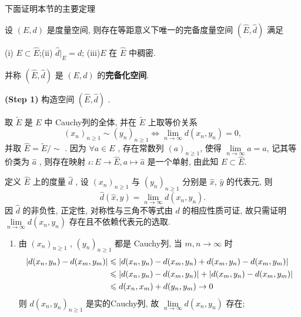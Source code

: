      下面证明本节的主要定理

     \begin{Theorem}[度量空间的完备化]
           设 $ (E, d) $ 是度量空间, 则存在等距意义下唯一的完备度量空间 $ (\widehat{E}, \hat{d}) $ 满足
           
           (i) $ E\subset \widehat{E} $;\hspace{6em}(ii) $ \hat{d}|_{E}=d $;\hspace{6em}  (iii)$ E $ 在 $ \widehat{E} $ 中稠密. 

           \noindent 并称 $ (\widehat{E}, \hat{d}) $ 是 $ (E, d) $ 的\textbf{完备化空间}.
     \end{Theorem}
     \begin{Proof}

          \textbf{(Step 1)} 构造空间 $ (\widehat{E}, \hat{d}) $ .

          取 $ \widetilde{E} $ 是 $ E $ 中 Cauchy列的全体, 并在 $ \widetilde{E} $ 上取等价关系
          \[
               (x_{n})_{n\geqslant1}\sim (y_{n})_{n\geqslant1}\Longleftrightarrow \lim_{n\to\infty}d(x_{n},y_{n})=0,
          \]
          并取 $ \widehat{E}=\widetilde{E}/\sim $ . 因为 $ \forall a\in E $ , 存在常数列  $ (a)_{n\geqslant1} $, 使得 $ \lim\limits_{n\to\infty}a=a $, 记其等价类为 $ \hat{a} $ , 则存在映射 $ \iota :E\to\widehat{E}, a\mapsto \hat{a} $ 是一个单射, 由此知 $ E\subset\widehat{E} $. 

          定义 $ \widehat{E} $ 上的度量 $ \hat{d} $ , 设 $ (x_{n})_{n\geqslant1} $ 与 $ (y_{n})_{n\geqslant1} $ 分别是 $ \hat{x} $, $ \hat{y} $ 的代表元, 则
          \[
               \hat{d}(\hat{x}, \hat{y})=\lim_{n\to\infty}d(x_{n},y_{n}).
          \]
          因 $ \hat{d} $ 的非负性, 正定性, 对称性与三角不等式由 $ d $ 的相应性质可证, 故只需证明 $ \lim\limits_{n\to\infty}d(x_{n}, y_{n}) $ 存在且不依赖代表元的选取.

          \begin{enumerate}[(1)]

               \item 由 $ (x_{n})_{n\geqslant1} $ , $ (y_{n})_{n\geqslant1} $ 都是 Cauchy列, 当 $ m, n\to\infty $ 时
               \[
                    \begin{aligned}
                         \left| d(x_{n}, y_{n})-d(x_{m}, y_{m}) \right|  & \leqslant \left| d(x_{n}, y_{n})-d(x_{m}, y_{n})+ d(x_{m}, y_{n})-d(x_{m}, y_{m}) \right| \\
                         & \leqslant \left| d(x_{n}, y_{n})-d(x_{m}, y_{n}) \right| +\left| d(x_{m}, y_{n})-d(x_{m}, y_{m}) \right| \\
                         & \leqslant d(x_{n}, x_{m})+d(y_{n}, y_{m})\to 0
                    \end{aligned}
               \]
               则 $ d(x_{n}, y_{n})_{n\geqslant1} $ 是实的Cauchy列,  故 $ \lim\limits_{n\to\infty}d(x_{n}, y_{n}) $ 存在;


\end{enumerate}
\end{Proof}
